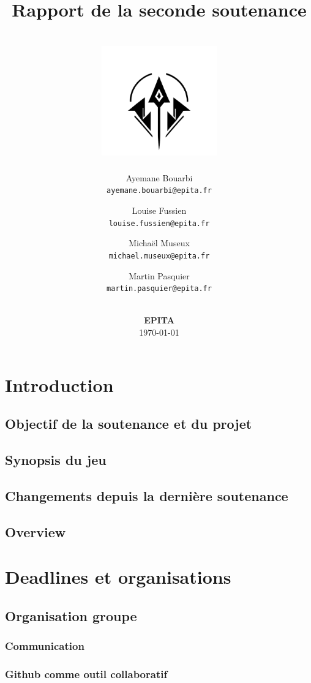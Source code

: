 \documentclass[12pt]{article}
\title{
    Rapport de la seconde soutenance \\
    \textbf{\gameName} \\
    \vspace{0.5cm}
    \includegraphics[width=5cm]{0.format/logo.png}
    \vspace{4.2cm}
}
\author{
    Ayemane Bouarbi \\
    \texttt{ayemane.bouarbi@epita.fr}
    \vspace{0.5cm}\and
    Louise Fussien \\
    \texttt{louise.fussien@epita.fr}
    \vspace{0.5cm}\and
    Michaël Museux \\
    \texttt{michael.museux@epita.fr}
    \vspace{0.5cm}\and
    Martin Pasquier \\
    \texttt{martin.pasquier@epita.fr}
}
\date{
    \vspace{1.5cm}
    \textbf{\companyName} \\
    \vspace{0.3cm}
    \textbf{EPITA} \\
    \vspace{1.5cm}
    \today
}
\begin{document}
\begin{titlepage}
    \maketitle
    \thispagestyle{empty} %
\end{titlepage}

\newpage
\thispagestyle{empty}
\mbox{}

\newpage
\tableofcontents

\newpage
\section{Introduction}
\subsection{Objectif de la soutenance et du projet}

\subsection{Synopsis du jeu}

\subsection{Changements depuis la dernière soutenance}

\subsection{Overview}




\newpage
\section{Deadlines et organisations}

\subsection{Organisation groupe}

\subsubsection{Communication}

\subsubsection{Github comme outil collaboratif}

\end{document}
